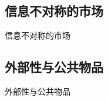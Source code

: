 \documentclass[UTF8]{ctexbeamer}
\begin{document}
\subsection{信息不对称的市场}
\begin{frame}{信息不对称的市场}
\end{frame}

\subsection{外部性与公共物品}
\begin{frame}{外部性与公共物品}
\end{frame}


\end{document}
